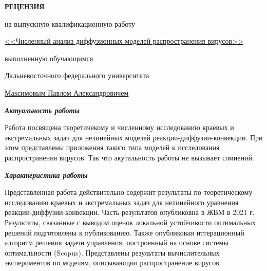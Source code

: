 \documentclass[12pt, a4paper, titlepage]{extarticle}
\begin{document}
	\drawtitle
	\thispagestyle{empty}

	\vspace*{-10pt}

	\begin{center}

		\textbf{РЕЦЕНЗИЯ}

		\vspace*{-4pt}
		на выпускную квалификационную работу

		\vspace*{-4pt}
		\underline{<<Численный анализ диффузионных моделей распространения вирусов>>}

		\vspace*{4pt}
		выполненную обучающимся 

		\vspace*{-4pt}
		Дальневосточного федерального университета

		\underline{Максимовым Павлом Александровичем}

	\end{center}

	\textbf{\textit{Актуальность работы}}

		Работа посвящена теоретичекому и численному исследованию краевых и экстремальных задач для нелинейных моделей реакции-диффузии-конвекции. При этом представлены приложения такого типа моделей к исследования распространения вирусов. Так что акутальность работы не вызывает сомнений.


	\textbf{\textit{Характеристика работы}}

		Представленная работа действительно содержит результаты по теоретическому исследованию краевых и экстремальных задач для нелинейного уравнения реакции-диффузии-конвекции. Часть результатов опубликовна в ЖВМ в 2021 г. Результаты, связанные с выводом оценок локальной устойчивости оптимальных решений подготовлены к публикованию. Также опубликован иттерационный алгоритм решения задачи управления, построенный на основе системы оптимальности (Scopus). Представлены результаты вычислительных экспериментов по моделям, описывающии распространение вирусов.
\end{document}
